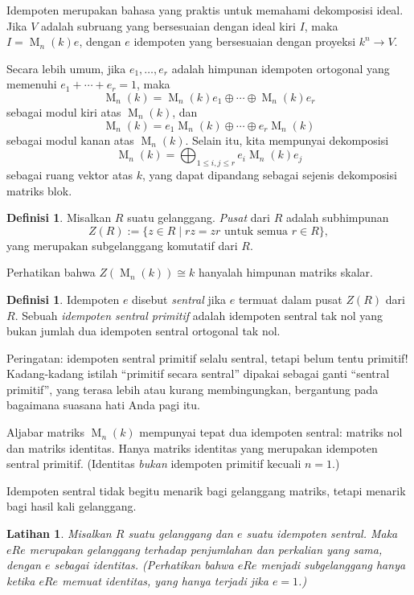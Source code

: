 \documentclass[12pt]{article}
\theoremstyle{plain}
\newtheorem{exercise}[theorem]{Latihan}
\theoremstyle{definition}
\newtheorem{definition}[theorem]{Definisi}
\theoremstyle{remark}
\numberwithin{equation}{section}
\begin{document}
Idempoten merupakan bahasa yang praktis untuk memahami
dekomposisi ideal.
Jika $V$ adalah subruang yang bersesuaian dengan ideal kiri $I$,
maka $I = \operatorname{M}_n(k)e$, dengan $e$ idempoten yang
bersesuaian dengan proyeksi $k^n \to V$.

Secara lebih umum, jika $e_1,\ldots,e_r$ adalah himpunan idempoten
ortogonal yang memenuhi $e_1+\cdots+e_r=1$, maka
\[
\operatorname{M}_n(k) = \operatorname{M}_n(k)e_1
\oplus \cdots \oplus \operatorname{M}_n(k)e_r
\]
sebagai modul kiri atas $\operatorname{M}_n(k)$, dan
\[
\operatorname{M}_n(k) = e_1\operatorname{M}_n(k)
\oplus \cdots \oplus e_r\operatorname{M}_n(k)
\]
sebagai modul kanan atas $\operatorname{M}_n(k)$.
Selain itu, kita mempunyai dekomposisi
\[
\operatorname{M}_n(k) = \bigoplus_{1\le i,j \le r}
e_i\operatorname{M}_n(k)e_j
\]
sebagai ruang vektor atas $k$, yang dapat dipandang sebagai sejenis dekomposisi
matriks blok.

\begin{definition}
Misalkan $R$ suatu gelanggang.
\emph{Pusat} dari $R$ adalah subhimpunan
\[
Z(R) := \{ z \in R \mid rz=zr \textrm{ untuk semua } r \in R \},
\]
yang merupakan subgelanggang komutatif dari $R$.
\end{definition}

Perhatikan bahwa $Z(\operatorname{M}_n(k)) \cong k$ hanyalah himpunan matriks
skalar.

\begin{definition}
Idempoten $e$ disebut \emph{sentral} jika $e$ termuat dalam pusat
$Z(R)$ dari $R$.
Sebuah \emph{idempoten sentral primitif} adalah idempoten sentral tak nol
yang bukan jumlah dua idempoten sentral ortogonal tak nol.
\end{definition}

Peringatan: idempoten sentral primitif selalu sentral,
tetapi belum tentu primitif!
Kadang-kadang istilah “primitif secara sentral” dipakai
sebagai ganti “sentral primitif”, yang terasa lebih atau kurang membingungkan,
bergantung pada bagaimana suasana hati Anda pagi itu.

Aljabar matriks $\operatorname{M}_n(k)$ mempunyai tepat dua idempoten
sentral: matriks nol dan matriks identitas.
Hanya matriks identitas yang merupakan idempoten sentral primitif.
(Identitas \emph{bukan} idempoten primitif kecuali $n=1$.)

Idempoten sentral tidak begitu menarik bagi gelanggang matriks, tetapi
menarik bagi hasil kali gelanggang.

\begin{exercise}
Misalkan $R$ suatu gelanggang dan $e$ suatu idempoten sentral.
Maka $eRe$ merupakan gelanggang terhadap penjumlahan dan perkalian yang sama,
dengan $e$ sebagai identitas.
(Perhatikan bahwa $eRe$ menjadi subgelanggang hanya ketika $eRe$ memuat
identitas, yang hanya terjadi jika $e=1$.)
\end{exercise}
\end{document}
